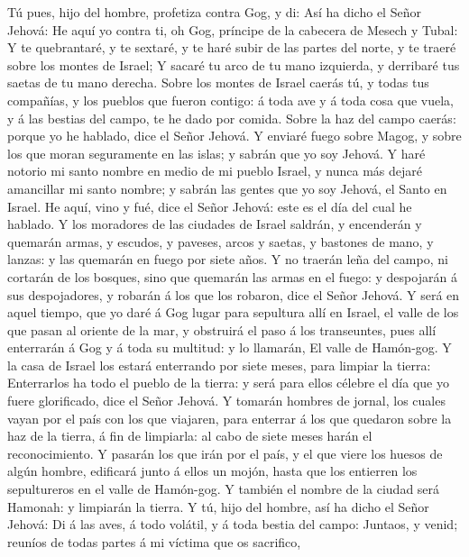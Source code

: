  Tú pues, hijo del hombre, profetiza contra Gog, y di: Así
ha dicho el Señor Jehová: He aquí yo contra ti, oh Gog, príncipe de la
cabecera de Mesech y Tubal:  Y te quebrantaré, y te sextaré,
y te haré subir de las partes del norte, y te traeré sobre los montes de
Israel;  Y sacaré tu arco de tu mano izquierda, y derribaré
tus saetas de tu mano derecha.  Sobre los montes de Israel
caerás tú, y todas tus compañías, y los pueblos que fueron contigo: á
toda ave y á toda cosa que vuela, y á las bestias del campo, te he dado
por comida.  Sobre la haz del campo caerás: porque yo he
hablado, dice el Señor Jehová.  Y enviaré fuego sobre Magog,
y sobre los que moran seguramente en las islas; y sabrán que yo soy
Jehová.  Y haré notorio mi santo nombre en medio de mi
pueblo Israel, y nunca más dejaré amancillar mi santo nombre; y sabrán
las gentes que yo soy Jehová, el Santo en Israel.  He aquí,
vino y fué, dice el Señor Jehová: este es el día del cual he hablado.
 Y los moradores de las ciudades de Israel saldrán, y
encenderán y quemarán armas, y escudos, y paveses, arcos y saetas, y
bastones de mano, y lanzas: y las quemarán en fuego por siete años.
 Y no traerán leña del campo, ni cortarán de los bosques,
sino que quemarán las armas en el fuego: y despojarán á sus
despojadores, y robarán á los que los robaron, dice el Señor Jehová.
 Y será en aquel tiempo, que yo daré á Gog lugar para
sepultura allí en Israel, el valle de los que pasan al oriente de la
mar, y obstruirá el paso á los transeuntes, pues allí enterrarán á Gog y
á toda su multitud: y lo llamarán, El valle de Hamón-gog. 
Y la casa de Israel los estará enterrando por siete meses, para limpiar
la tierra:  Enterrarlos ha todo el pueblo de la tierra: y
será para ellos célebre el día que yo fuere glorificado, dice el Señor
Jehová.  Y tomarán hombres de jornal, los cuales vayan por
el país con los que viajaren, para enterrar á los que quedaron sobre la
haz de la tierra, á fin de limpiarla: al cabo de siete meses harán el
reconocimiento.  Y pasarán los que irán por el país, y el
que viere los huesos de algún hombre, edificará junto á ellos un mojón,
hasta que los entierren los sepultureros en el valle de Hamón-gog.
 Y también el nombre de la ciudad será Hamonah: y limpiarán
la tierra.  Y tú, hijo del hombre, así ha dicho el Señor
Jehová: Di á las aves, á todo volátil, y á toda bestia del campo:
Juntaos, y venid; reuníos de todas partes á mi víctima que os sacrifico,
